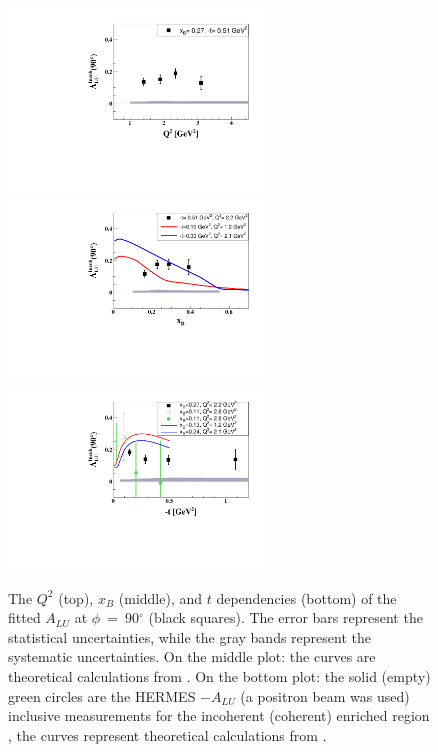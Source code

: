 \documentclass[twocolumn,nofootinbib,showpacs,prl,superscriptaddress,secnumarabic,amssymb,nobibnotes,aps,floatfix]{revtex4}
\begin{document}
\begin{figure}[tb]
\includegraphics[width=6.9cm]{figs/ALU_90_p_vs_Q2_shortscenrario.pdf}
\includegraphics[width=6.9cm]{figs/ALU_90_p_vs_x_shortscenrario.pdf}
\includegraphics[width=6.9cm]{figs/ALU_90_p_vs_t_shortscenrario.pdf}
\caption{The $Q^{2}$ (top), $x_{B}$ (middle), and $t$ dependencies (bottom) of
   the fitted $A_{LU}$ at $\phi$~=~90$^{\circ}$ (black squares). The error bars 
   represent the statistical uncertainties, while the gray bands represent the 
   systematic uncertainties. On the middle plot: the curves are theoretical 
   calculations from \cite{simonetta_2}. On the bottom plot: the solid (empty) 
   green circles are the HERMES $-A_{LU}$ (a positron beam was used) inclusive 
   measurements for the incoherent (coherent) enriched region 
   \cite{Airapetian:2009cga}, the curves represent theoretical calculations 
   from \cite{simonetta_2}.  } \label{fig:alu90}
\end{figure}
\end{document}
